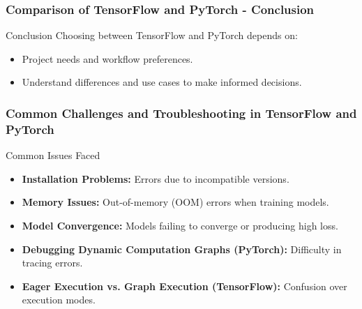 \documentclass[aspectratio=169]{beamer}
\begin{document}
\begin{frame}[fragile]
    \frametitle{Comparison of TensorFlow and PyTorch - Conclusion}
    \begin{block}{Conclusion}
        Choosing between TensorFlow and PyTorch depends on:
        \begin{itemize}
            \item Project needs and workflow preferences.
            \item Understand differences and use cases to make informed decisions.
        \end{itemize}
    \end{block}
\end{frame}

\begin{frame}[fragile]
    \frametitle{Common Challenges and Troubleshooting in TensorFlow and PyTorch}
    \begin{block}{Common Issues Faced}
        \begin{itemize}
            \item \textbf{Installation Problems:} Errors due to incompatible versions.
            \item \textbf{Memory Issues:} Out-of-memory (OOM) errors when training models.
            \item \textbf{Model Convergence:} Models failing to converge or producing high loss.
            \item \textbf{Debugging Dynamic Computation Graphs (PyTorch):} Difficulty in tracing errors.
            \item \textbf{Eager Execution vs. Graph Execution (TensorFlow):} Confusion over execution modes.
        \end{itemize}
    \end{block}
\end{frame}
\end{document}
